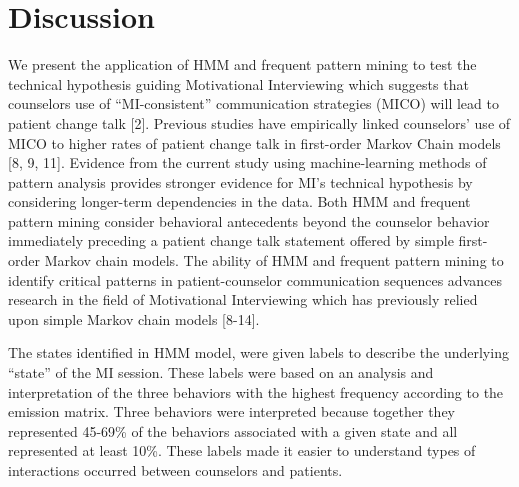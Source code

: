\section{Discussion}
\label{sec:discussion}
We present the application of HMM and frequent pattern mining to test the technical hypothesis guiding Motivational Interviewing which suggests that counselors use of “MI-consistent” communication strategies (MICO) will lead to patient change talk [2]. Previous studies have empirically linked counselors’ use of MICO to higher rates of patient change talk in first-order Markov Chain models [8, 9, 11]. Evidence from the current study using machine-learning methods of pattern analysis provides stronger evidence for MI’s technical hypothesis by considering longer-term dependencies in the data. Both HMM and frequent pattern mining consider behavioral antecedents beyond the counselor behavior immediately preceding a patient change talk statement offered by simple first-order Markov chain models. The ability of HMM and frequent pattern mining to identify critical patterns in patient-counselor communication sequences advances research in the field of Motivational Interviewing which has previously relied upon simple Markov chain models [8-14].

The states identified in HMM model, were given labels to describe the underlying “state” of the MI session. These labels were based on an analysis and interpretation of the three behaviors with the highest frequency according to the emission matrix. Three behaviors were interpreted because together they represented 45-69\% of the behaviors associated with a given state and all represented at least 10\%. These labels made it easier to understand types of interactions occurred between counselors and patients. 

